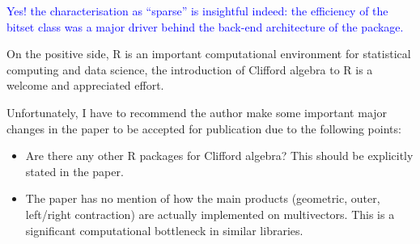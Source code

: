 \documentclass{article}
\begin{document}
\textcolor{blue}{Yes! the characterisation as ``sparse'' is insightful
  indeed: the efficiency of the bitset class was a major driver behind
  the back-end architecture of the package.}

On the positive side, R is an important computational environment for
statistical computing and data science, the introduction of Clifford
algebra to R is a welcome and appreciated effort.

Unfortunately, I have to recommend the author make some important
major changes in the paper to be accepted for publication due to the
following points:

\begin{itemize}
  \item Are there any other R packages for Clifford algebra? This
    should be explicitly stated in the paper.
  \item The paper has no mention of how the main products (geometric,
    outer, left/right contraction) are actually implemented on
    multivectors. This is a significant computational bottleneck in
    similar libraries.


\end{itemize}
\end{document}
